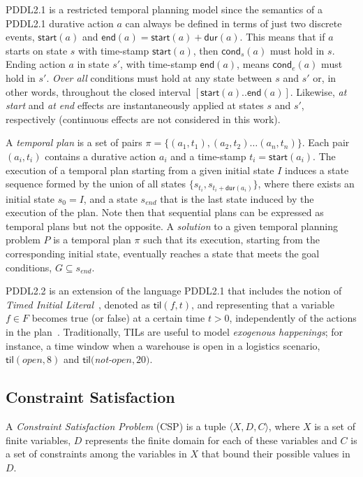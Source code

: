 \documentclass{ecai}
\newcommand{\tup}[1]{{\langle #1 \rangle}}
\newcommand{\cond}{\mathsf{cond}}  %
\newcommand{\dur}{\mathsf{dur}}    %
\newcommand{\start}{\mathsf{start}}%
\newcommand{\en}{\mathsf{end}}     %
\newcommand{\til}{\mathsf{til}}    %
\begin{document}
PDDL2.1 is a restricted temporal planning model since the semantics of a PDDL2.1 durative action $a$ can always be defined in terms of just two discrete events, $\start(a)$ and $\en(a)=\start(a)+\dur(a)$. This means that if $a$ starts on state $s$ with time-stamp $\start(a)$, then $\cond_s(a)$ must hold in $s$. Ending action $a$ in state $s'$, with time-stamp $\en(a)$, means $\cond_e(a)$ must hold in $s'$. {\em Over all} conditions must hold at any state between $s$ and $s'$ or, in other words, throughout the closed interval $[\start(a)..\en(a)]$. Likewise, {\em at start} and {\em at end} effects are instantaneously applied at states $s$ and $s'$, respectively (continuous effects are not considered in this work). 

A {\em temporal plan} is a set of pairs $\pi=\{(a_1,t_1),(a_2,t_2)\ldots (a_n,t_n)\}$. Each pair $(a_i,t_i)$ contains a durative action $a_i$ and a time-stamp $t_i=\start(a_i)$. The execution of a temporal plan starting from a given initial state $I$ induces a state sequence formed by the union of all states $\{s_{t_i}, s_{t_i+\dur(a_i)}\}$, where there exists an initial state $s_{0}=I$, and a state $s_{end}$ that is the last state induced by the execution of the plan. Note then that sequential plans can be expressed as temporal plans but not the opposite. A {\em solution} to a given temporal planning problem $P$ is a temporal plan $\pi$ such that its execution, starting from the corresponding initial state, eventually reaches a state that meets the goal conditions, $G\subseteq s_{end}$.

PDDL2.2 is an extension of the language PDDL2.1 that includes the notion of {\em Timed Initial Literal}~\cite{hoffmann2005}, denoted as $\til(f,t)$, and representing that a variable $f\in F$ becomes true (or false) at a certain time $t>0$, independently of the actions in the plan~\cite{Edelkamp04}. Traditionally, TILs are useful to model {\em exogenous happenings}; for instance, a time window when a warehouse is open in a logistics scenario, $\til(open,8)$ and $\til($\textit{not-}$open,20)$.

\subsection{Constraint Satisfaction}
A {\em Constraint Satisfaction Problem} (CSP) is a tuple $\tup{X,D,C}$, where $X$ is a set of finite variables, $D$ represents the finite domain for each of these variables and $C$ is a set of constraints among the variables in $X$ that bound their possible values in $D$.
\end{document}
